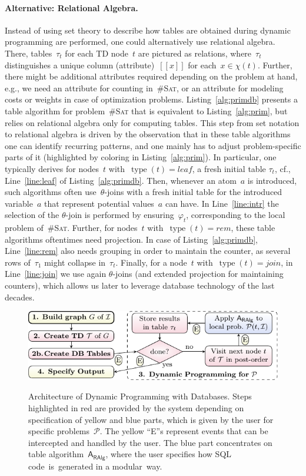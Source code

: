 \documentclass{llncs}
\newcommand{\cid}[1]{\ensuremath{[\![#1]\!]}}
\newcommand{\cSAT}{\textsc{\#Sat}\xspace}%
\newcommand{\algo}[1]{\ensuremath{\mathsf{#1}}}
\newcommand{\tab}[1]{\ensuremath{\tau_{#1}}}
\DeclareMathOperator{\type}{type}
\newcommand{\leaf}{\textit{leaf}}
\newcommand{\rem}{\textit{rem}}
\newcommand{\join}{\textit{join}}
\begin{document}
\paragraph*{Alternative: Relational Algebra.}
\noindent Instead of using set theory to describe how tables are obtained during dynamic programming 
are performed, one could alternatively use relational algebra. %
There, tables~$\tab{t}$ for each TD node~$t$ are pictured as relations, where~$\tab{t}$ distinguishes a unique column (attribute)~$\cid{x}$ for each~$x\in\chi(t)$.
Further, there might be additional attributes required depending on the problem at hand, e.g., we need an attribute  for counting in~\cSAT, or an attribute for modeling costs or weights in case of optimization problems.
Listing~\ref{alg:primdb} presents a table algorithm for problem~\cSAT that is equivalent to Listing~\ref{alg:prim}, but relies on relational algebra only for computing tables.
This step from set notation to relational algebra is driven by the observation that in these table algorithms one can identify recurring patterns, and one mainly has to adjust problem-specific parts of it (highlighted by coloring in Listing~\ref{alg:prim}).
%
%
In particular, one typically derives for nodes~$t$ with~$\type(t)=\leaf$, a fresh initial table $\tab{t}$, cf., Line~\ref{line:leaf} of Listing~\ref{alg:primdb}.
Then, whenever an atom~$a$ is introduced, such algorithms often use~$\theta$-joins with a fresh initial table for the introduced variable~$a$ that represent potential values~$a$ can have. In Line~\ref{line:intr} the selection of the $\theta$-join is performed by ensuring~$\varphi_t$, corresponding to the local problem of~\cSAT.
Further, for nodes~$t$ with~$\type(t)=\rem$, these table algorithms oftentimes need projection. 
In case of Listing~\ref{alg:primdb}, Line~\ref{line:rem} also needs grouping in order to maintain the counter, as several rows of~$\tab{1}$ might collapse in~$\tab{t}$.
Finally, for a node~$t$ with~$\type(t)=\join$, in Line~\ref{line:join} we use again $\theta$-joins (and extended projection for maintaining counters), which allows us later to leverage database technology of the last decades.

\begin{figure}[t]%
\centering
  {\noindent\includegraphics[]{1-figs/figure.pdf}}
  \caption{Architecture of Dynamic Programming with Databases. Steps highlighted in red are provided by the system depending on specification of yellow and blue parts, which is given by the user for specific problems~$\mathcal{P}$. The yellow ``E''s represent events that can be intercepted and handled by the user. 
  The blue part concentrates on table algorithm~$\algo{A_{RAlg}}$, where the user specifies how SQL code~is~generated in a modular~way.}
  \label{fig:arch}
%
\end{figure}
\end{document}
